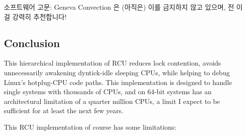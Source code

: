 소프트웨어 고문: Geneva Convection 은 (아직은) 이를 금지하지 않고 있으며, 전
이걸 강력히 추천합니다!
\iffalse

For a large change that affects RCU core code, one should run
rcutorture for each of the above combinations, and concurrently
with CPU offlining and onlining for cases with
\co{CONFIG_HOTPLUG_CPU}.
For small changes, it may suffice to run kernbench in each case.
Of course, if the change is confined to a particular subset of
the configuration parameters, it may be possible to reduce the
number of test cases.

Torturing software: the Geneva Convention does not (yet) prohibit
it, and I strongly recommend it!
\fi

\subsection{Conclusion}
\label{app:rcuimpl:rcutree:Conclusion}

This hierarchical implementation of RCU reduces lock contention,
avoids unnecessarily awakening dyntick-idle sleeping CPUs, while
helping to debug Linux's hotplug-CPU code paths.
This implementation is designed to handle single systems with
thousands of CPUs, and on 64-bit systems has an architectural
limitation of a quarter million CPUs, a limit I expect to be
sufficient for at least the next few years.

This RCU implementation of course has some limitations:

